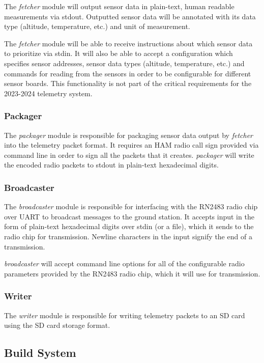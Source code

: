 The \textit{fetcher} module will output sensor data in plain-text, human readable measurements via \gls{stdout}.
Outputted sensor data will be annotated with its data type (altitude, temperature, etc.) and unit of measurement.

The \textit{fetcher} module will be able to receive instructions about which sensor data to prioritize via \gls{stdin}.
It will also be able to accept a configuration which specifies sensor addresses, sensor data types (altitude,
temperature, etc.) and commands for reading from the sensors in order to be configurable for different
 sensor boards. This functionality is not part of the critical requirements for the 2023-2024
telemetry system.

\subsubsection{Packager}

The \textit{packager} module is responsible for packaging sensor data output by \textit{fetcher} into the
 telemetry packet format. It requires an HAM radio call sign provided via command line in order
to sign all the packets that it creates. \textit{packager} will write the encoded radio packets to \gls{stdout} in
plain-text hexadecimal digits.

\subsubsection{Broadcaster}

The \textit{broadcaster} module is responsible for interfacing with the  RN2483 radio chip over UART
to broadcast messages to the ground station. It accepts input in the form of plain-text hexadecimal digits over
\gls{stdin} (or a file), which it sends to the radio chip for transmission. Newline characters in the input signify the
end of a transmission.

\textit{broadcaster} will accept command line options for all of the configurable radio parameters provided by the
RN2483 radio chip, which it will use for transmission.

\subsubsection{Writer}

The \textit{writer} module is responsible for writing  telemetry packets to an SD card using the
 SD card storage format.

\subsection{Build System}
